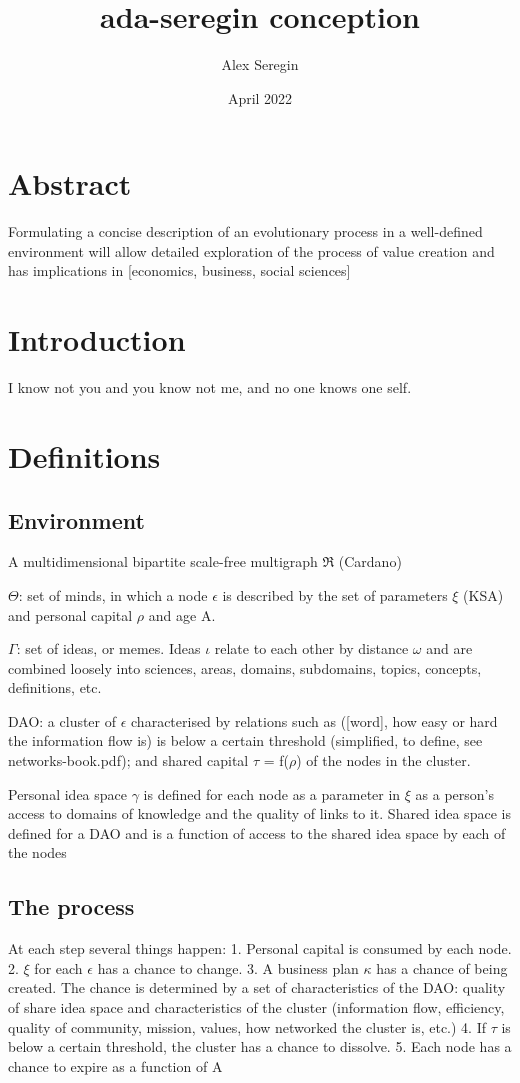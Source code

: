 \documentclass{article}
\title{ada-seregin conception}
\author{Alex Seregin}
\date{April 2022}
\begin{document}
\maketitle
\section{Abstract}
Formulating a concise description of an evolutionary process in a well-defined environment will allow detailed exploration of the process of value creation and has implications in [economics, business, social sciences]
\section{Introduction}
I know not you and you know not me, and no one knows one self.
\section{Definitions}
\subsection{Environment}
A multidimensional bipartite scale-free multigraph $\Re$ (Cardano)

$\Theta$: set of minds, in which a node $\epsilon$ is described by the set of parameters $\xi$ (KSA) and personal capital $\rho$ and age A.

$\Gamma$: set of ideas, or memes. Ideas $\iota$ relate to each other by distance $\omega$ and are combined loosely into sciences, areas, domains, subdomains, topics, concepts, definitions, etc.

DAO: a cluster of $\epsilon$ characterised by relations such as ([word], how easy or hard the information flow is) is below a certain threshold (simplified, to define, see networks-book.pdf); and shared capital $\tau$ = f($\rho$) of the nodes in the cluster.

Personal idea space $\gamma$ is defined for each node as a parameter in $\xi$ as a person's access to domains of knowledge and the quality of links to it. 
Shared idea space is defined for a DAO and is a function of access to the shared idea space by each of the nodes

\subsection{The process}
At each step several things happen:
1. Personal capital is consumed by each node. 
2. $\xi$ for each $\epsilon$ has a chance to change.
3. A business plan $\kappa$ has a chance of being created. The chance is determined by a set of characteristics of the DAO: quality of share idea space and characteristics of the cluster (information flow, efficiency, quality of community, mission, values, how networked the cluster is, etc.)
4. If $\tau$ is below a certain threshold, the cluster has a chance to dissolve.
5. Each node has a chance to expire as a function of A
\end{document}
